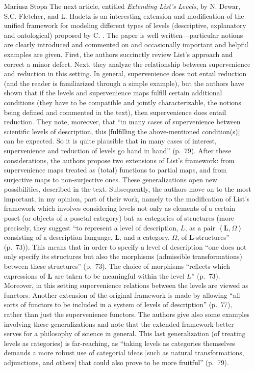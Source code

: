 \begin{recengenv}{Mariusz Stopa}
\enlargethispage{-.5\baselineskip}
The next article, entitled \textit{Extending List’s Levels}, by N. Dewar, S.C. Fletcher, and L. Hudetz is an interesting extension and modification of the unified framework for modeling different types of levels (descriptive, explanatory and ontological) proposed by C. \textcite{list_levels_2019}. The paper is well written---particular notions are clearly introduced and commented on and occasionally important and helpful examples are given. First, the authors succinctly review List's approach and correct a minor defect. Next, they analyze the relationship between supervenience and reduction in this setting. In general, supervenience does not entail reduction (and the reader is familiarized through a simple example), but the authors have shown that if the levels and supervenience maps fulfill certain additional conditions (they have to be compatible and jointly characterizable, the notions being defined and commented in the text), then supervenience does entail reduction. They note, moreover, that ``in many cases of supervenience between scientific levels of description, this [fulfilling the above-mentioned condition(s)] can be expected. So it is quite plausible that in many cases of interest, supervenience and reduction of levels go hand in hand'' (p.~79). After these considerations, the authors propose two extensions of List's framework: from supervenience maps treated as (total) functions to partial maps, and from surjective maps to non-surjective ones. These generalizations open new possibilities, described in the text. Subsequently, the authors move on to the most important, in my opinion, part of their work, namely to the modification of List's framework which involves considering levels not only as elements of a certain poset (or objects of a posetal cat\-e\-go\-ry) but as cat\-e\-gories of structures (more precisely, they suggest ``to represent a level of description, $ L $, as a pair $ \left\langle \mathbf{L},\Omega\right\rangle  $ consisting of a description language, $ \mathbf{L} $, and a cat\-e\-go\-ry, $ \Omega $, of $\mathbf{L}$-structures'' (p.~73)). This means that in order to specify a level of description ``one does not only specify its structures but also the morphisms (admissible transformations) between these structures'' (p.~73). The choice of morphisms ``reflects which expressions of $ \mathbf{L} $ are taken to be meaningful within the level $ L $'' (p.~73). Moreover, in this setting supervenience relations between the levels are viewed as functors. Another extension of the original framework is made by allowing ``all sorts of functors to be included in a system of levels of description'' (p.~77), rather than just the supervenience functors. The authors give also some examples involving these generalizations and note that the extended framework better serves for a philosophy of science in general. This last generalization (of treating levels as cat\-e\-gories) is far-reaching, as ``taking levels as cat\-e\-gories themselves demands a more robust use of cat\-e\-go\-rial ideas [such as natural transformations, adjunctions, and others] that could also prove to be more fruitful'' (p.~79).


\end{recengenv}
